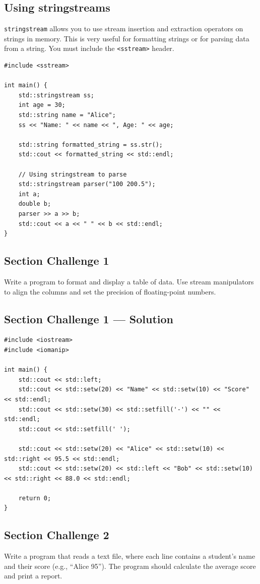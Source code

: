 \subsection{Using stringstreams}
\texttt{stringstream} allows you to use stream insertion and extraction operators on strings in memory. This is very useful for formatting strings or for parsing data from a string. You must include the \texttt{<sstream>} header.
\begin{lstlisting}
#include <sstream>

int main() {
	std::stringstream ss;
	int age = 30;
	std::string name = "Alice";
	ss << "Name: " << name << ", Age: " << age;

	std::string formatted_string = ss.str();
	std::cout << formatted_string << std::endl;

	// Using stringstream to parse
	std::stringstream parser("100 200.5");
	int a;
	double b;
	parser >> a >> b;
	std::cout << a << " " << b << std::endl;
}
\end{lstlisting}

\subsection{Section Challenge 1}
Write a program to format and display a table of data. Use stream manipulators to align the columns and set the precision of floating-point numbers.

\subsection{Section Challenge 1 --- Solution}
\begin{lstlisting}
#include <iostream>
#include <iomanip>

int main() {
	std::cout << std::left;
	std::cout << std::setw(20) << "Name" << std::setw(10) << "Score" << std::endl;
	std::cout << std::setw(30) << std::setfill('-') << "" << std::endl;
	std::cout << std::setfill(' ');

	std::cout << std::setw(20) << "Alice" << std::setw(10) << std::right << 95.5 << std::endl;
	std::cout << std::setw(20) << std::left << "Bob" << std::setw(10) << std::right << 88.0 << std::endl;

	return 0;
}
\end{lstlisting}

\subsection{Section Challenge 2}
Write a program that reads a text file, where each line contains a student's name and their score (e.g., ``Alice 95''). The program should calculate the average score and print a report.

